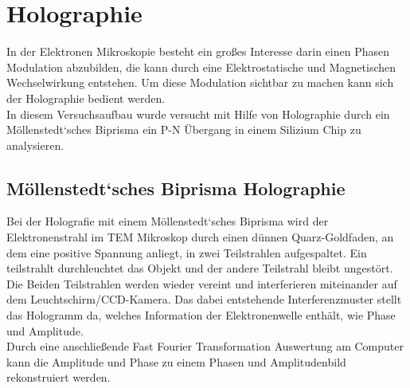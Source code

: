 \section{Holographie}
In der Elektronen Mikroskopie besteht ein großes Interesse darin einen Phasen Modulation abzubilden, die kann durch eine Elektrostatische und Magnetischen Wechselwirkung entstehen. Um diese Modulation sichtbar zu machen kann sich der Holographie bedient werden. \\
In diesem Versuchsaufbau wurde versucht mit Hilfe von Holographie durch ein Möllenstedt‘sches Biprisma ein P-N Übergang in einem Silizium Chip zu analysieren.

\subsection{Möllenstedt‘sches Biprisma Holographie}
Bei der Holografie mit einem Möllenstedt‘sches Biprisma wird der Elektronenstrahl im TEM Mikroskop durch einen dünnen Quarz-Goldfaden, an dem eine positive Spannung anliegt, in zwei Teilstrahlen aufgespaltet. Ein teilstrahlt durchleuchtet das Objekt und der andere Teilstrahl bleibt ungestört. Die Beiden Teilstrahlen werden wieder vereint und interferieren miteinander auf dem Leuchtschirm/CCD-Kamera. Das dabei entstehende Interferenzmuster stellt das Hologramm da, welches Information der Elektronenwelle enthält, wie Phase und Amplitude.\\
Durch eine anschließende Fast Fourier Transformation Auswertung am Computer kann die Amplitude und Phase zu einem Phasen und Amplitudenbild rekonstruiert werden.

